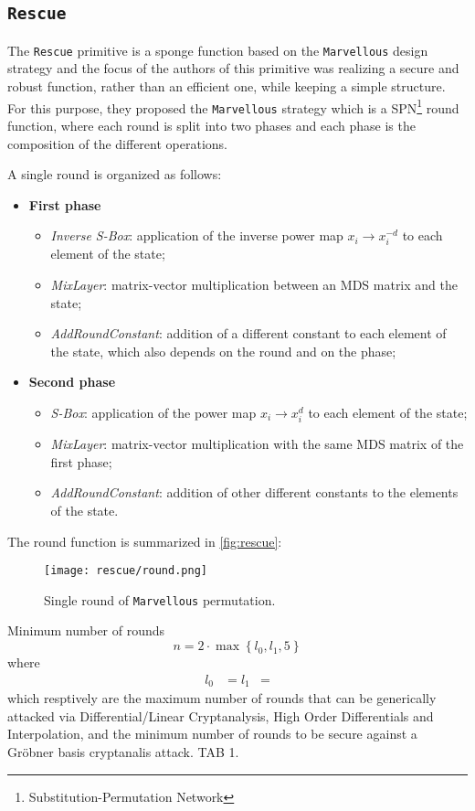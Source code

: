 \documentclass[12pt, a4paper]{report}
\begin{document}
\subsection{\texttt{Rescue}}\label{subsec:rescue}

The \texttt{Rescue} primitive is a sponge function based on the \texttt{Marvellous} design strategy and the focus of the authors of this primitive was realizing a secure and robust function, rather than an efficient one, while keeping a simple structure.
For this purpose, they proposed the \texttt{Marvellous} strategy which is a SPN\footnote{Substitution-Permutation Network} round function, where each round is split into two phases and each phase is the composition of the different operations.

A single round is organized as follows:
\begin{itemize}
  \item \textbf{First phase}
  \begin{itemize}
    \item \textit{Inverse S-Box}: application of the inverse power map $x_i \rightarrow x_i^{-d}$ to each element of the state;
    \item \textit{MixLayer}: matrix-vector multiplication between an MDS matrix and the state;
    \item \textit{AddRoundConstant}: addition of a different constant to each element of the state, which also depends on the round and on the phase;
  \end{itemize}
  \item \textbf{Second phase}
  \begin{itemize}
    \item \textit{S-Box}: application of the power map $x_i \rightarrow x_i^d$ to each element of the state;
    \item \textit{MixLayer}: matrix-vector multiplication with the same MDS matrix of the first phase;
    \item \textit{AddRoundConstant}: addition of other different constants to the elements of the state.
  \end{itemize}
\end{itemize}

The round function is summarized in \autoref{fig:rescue}:
\begin{figure}[H]
  \begin{center}
    \texttt{[image: rescue/round.png]}
  \end{center}
  \caption{Single round of \texttt{Marvellous} permutation.}\label{fig:rescue}
\end{figure}
Minimum number of rounds
\begin{equation}
  n = 2 \cdot \max \left\{l_0, l_1, 5 \right\}
  \label{eq:rescuerounds}
\end{equation}
where
\begin{align}
  l_0 & = 
  l_1 & =
\end{align}
which resptively are the maximum number of rounds that can be generically attacked via Differential/Linear Cryptanalysis, High Order Differentials and Interpolation, and the minimum number of rounds to be secure against a Gr\"obner basis cryptanalis attack. TAB 1.
\end{document}
